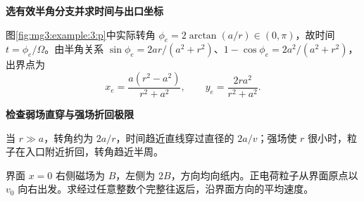 \begin{solution}
{\begin{tikzpicture}
\end{tikzpicture}}



\par\medskip{}\noindent\textbf{选有效半角分支并求时间与出口坐标}\par\nobreak
图\ref{fig:mg3:example:3:p}中实际转角 $\phi_e=2\arctan(a/r)\in(0,\pi)$，故时间 $t=\phi_e/\Omega$。由半角关系 $\sin\phi_e=2ar/(a^2+r^2)$、$1-\cos\phi_e=2a^2/(a^2+r^2)$，出界点为
\[
x_e=\frac{a(r^2-a^2)}{r^2+a^2},\qquad
y_e=\frac{2ra^2}{r^2+a^2}.
\]


\par\medskip{}\noindent\textbf{检查弱场直穿与强场折回极限}\par\nobreak
当 $r\gg a$，转角约为 $2a/r$，时间趋近直线穿过直径的 $2a/v$；强场使 $r$ 很小时，粒子在入口附近折回，转角趋近半周。\end{solution}
\begin{question}\begin{example}[两侧不同磁场中的平均漂移]\label{mg3:example:4}
界面 $x=0$ 右侧磁场为 $B$，左侧为 $2B$，方向均向纸内。正电荷粒子从界面原点以 $v_0$ 向右出发。求经过任意整数个完整往返后，沿界面方向的平均速度。
\end{example}
\end{question}
